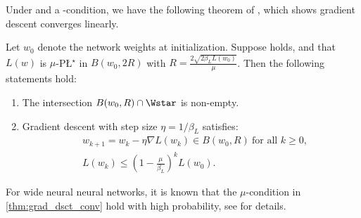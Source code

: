 Under  and a \PL-condition, we have the following theorem of \citet{liu2022loss}, which shows gradient descent converges linearly. 
\begin{theorem}
\label{thm:grad_dsct_conv}
    Let $w_0$ denote the network weights at initialization. 
    Suppose  holds, and that $L(w)$ is $\mu$-P\L$^{\star}$ in $B(w_0,2R)$ with $R = \frac{2\sqrt{2\beta_{L}L(w_0)}}{\mu}$.
    Then the following statements hold:
    \begin{enumerate}
        \item The intersection $B(w_0,R)\cap\Wstar$ is non-empty.
        \item Gradient descent with step size $\eta = 1/\beta_L$ satisfies:
        \begin{align*}
        &w_{k+1} = w_k-\eta \nabla L(w_k)\in B(w_0,R)~ \text{for all } k\geq 0,\\
        &L(w_k)\leq \left(1-\frac{\mu}{\beta_L}\right)^kL(w_0).
        \end{align*}
    \end{enumerate}
\end{theorem}
For wide neural neural networks, it is known that the $\mu$-\PL condition in \cref{thm:grad_dsct_conv} hold with high probability, see \citet{liu2022loss} for details.

